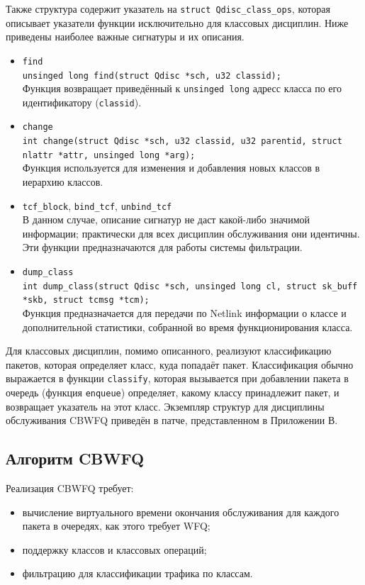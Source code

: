 	Также структура содержит указатель на \lstinline{struct Qdisc_class_ops},
	которая описывает указатели функции исключительно для классовых дисциплин.
	Ниже приведены наиболее важные сигнатуры и их описания.
	\begin{itemize}
		\item \lstinline{find}\\
			\lstinline{unsinged long find(struct Qdisc *sch, u32 classid);}\\
			Функция возвращает приведённый к \lstinline{unsinged long} адресс класса по его идентификатору (\lstinline{classid}).
		\item \lstinline{change} \\
			\lstinline{int change(struct Qdisc *sch, u32 classid, u32 parentid, struct nlattr *attr, unsinged long *arg);}\\
			Функция используется для изменения и добавления новых классов в иерархию классов. 
		\item \lstinline{tcf_block}, \lstinline{bind_tcf}, \lstinline{unbind_tcf}\\
			В данном случае, описание сигнатур не даст какой-либо значимой информации; практически
			для всех дисциплин обслуживания они идентичны. Эти функции предназначаются для работы
			системы фильтрации.
		\item \lstinline{dump_class}\\
			\lstinline{int dump_class(struct Qdisc *sch, unsinged long cl, struct sk_buff *skb, struct tcmsg *tcm);} \\
			Функция предназначается для передачи по Netlink информации о классе и дополнительной статистики, собранной
			во время функционирования класса.
	\end{itemize}

	Для классовых дисциплин, помимо описанного, реализуют классификацию пакетов, которая
	определяет класс, куда попадаёт пакет. Классификация обычно выражается в функции \lstinline{classify},
	которая вызывается при добавлении пакета в очередь (функция \lstinline{enqueue}) определяет, какому классу
	 принадлежит пакет, и возвращает указатель на этот класс.
	Экземпляр структур для дисциплины обслуживания CBWFQ приведён в патче, представленном в Приложении В.

	\subsection{Алгоритм CBWFQ}

		Реализация CBWFQ требует:
		\begin{itemize}
			\item вычисление виртуального времени окончания обслуживания для каждого
				   пакета в очередях, как этого требует WFQ;
			\item поддержку классов и классовых операций;
			\item фильтрацию для классификации трафика по классам.
		\end{itemize}

